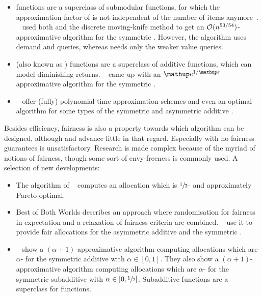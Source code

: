 \begin{itemize}
	\item
	\XOS{} functions are a superclass of submodular functions, for which the approximation factor of \RepReMatch{} is not independent of the number of items anymore~\cite[Section 6.2]{APNSWuSVþUM}.
	~\cite{sublin_approx_algo_for_nsw_with_xos_valuations} used both \RepReMatch{} and the discrete moving-knife method to get an \(\mathcal{O}(n^{53/54})\)-approximative algorithm for the symmetric \XOS{} \NSW.
	However, the algorithm uses demand and \XOS{} queries, whereas \RepReMatch{} needs only the weaker value queries.

	\item
	\CASC{} (also known as \SPLC) functions are a superclass of additive functions, which can model diminishing returns.
	~\cite{fair_division_of_indiv_goods_for_a_class_of_concave_valuations} came up with an \(\euler^{1/\euler}\)-approximative algorithm for the symmetric \CASC{} \NSW.

	\item
	~\cite{tractable_fragments_of_the_max_nsw_problem} offer (fully) polynomial-time approximation schemes and even an optimal algorithm for some types of the symmetric and asymmetric additive \NSW.
\end{itemize}
Besides efficiency, fairness is also a property towards which algorithm can be designed, although \SMatch{} and \RepReMatch{} advance little in that regard.
Especially \RepReMatch{} with no fairness guarantees is unsatisfactory.
Research is made complex because of the myriad of notions of fairness, though some sort of envy-freeness is commonly used.
A selection of new developments:
\begin{itemize}
	\item
	The algorithm of \citeauthor{fair_division_of_indiv_goods_for_a_class_of_concave_valuations}~\cite{fair_division_of_indiv_goods_for_a_class_of_concave_valuations} computes an allocation which is \(\sfrac{1}{2}\)-\EFone{} and approximately Pareto-optimal.

	\item
	Best of Both Worlds describes an approach where randomisation for fairness in expectation and a relaxation of fairness criteria are combined.
	~\cite{bobw_agents_with_entitlements} use it to provide fair allocations for the asymmetric additive \NSW{} and the symmetric \XOS{} \NSW.

	\item
	~\cite{on_optimal_tradeoffs_between_efx_and_nsw} show a \((\alpha + 1)\)-approximative algorithm computing allocations which are \(\alpha\)-\EFX{} for the symmetric additive \NSW{} with \(\alpha \in [0, 1]\).
	They also show a \((\alpha+1)\)-approximative algorithm computing allocations which are \(\alpha\)-\EFX{} for the symmetric subadditive \NSW{} with \(\alpha \in [0, \sfrac{1}{2}]\).
	Subadditive functions are a superclass for \XOS{} functions.
\end{itemize}
